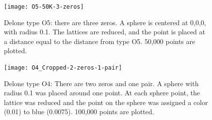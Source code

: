 \documentclass[preprint]{iucr}              %
\begin{document}
	\begin{figure}
		\caption{Delone type O5: there are three zeros. A sphere 
			is centered at 0,0,0, with radius 0.1. The lattices are 
			reduced, and the point is 
			placed at a distance equal to the distance from type O5. 50,000
			points are plotted.}
		\label{fig:O5}
		\texttt{[image: O5-50K-3-zeros]}
	\end{figure}
	
	\begin{figure}
		\caption{Delone type O4: There are two zeros and one pair.
			A sphere with radius 0.1 was placed around one point. At each
			sphere point, the lattice was reduced and the point on the sphere
			was assigned a color (0.01) to blue (0.0075). 100,000 points are plotted.}
		\label{fig:O4}
		\texttt{[image: O4\_Cropped-2-zeros-1-pair]}
	\end{figure}
	
\end{document}
